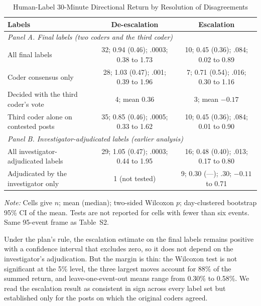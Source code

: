 \documentclass[11pt]{article}
\begin{document}
\begin{table}[h]
\centering
\small
\caption{Human-Label 30-Minute Directional Return by Resolution of Disagreements}
\label{tab:adjudication}
\begin{tabular}{lcc}
\toprule
Labels & De-escalation & Escalation \\
\midrule
\multicolumn{3}{l}{\textit{Panel A. Final labels (two coders and the third coder)}} \\
All final labels & 32; 0.94 (0.46); .0003; 0.38 to 1.73 & 10; 0.45 (0.36); .084; 0.02 to 0.89 \\
Coder consensus only & 28; 1.03 (0.47); .001; 0.39 to 1.96 & 7; 0.71 (0.54); .016; 0.30 to 1.16 \\
Decided with the third coder's vote & 4; mean 0.36 & 3; mean $-0.17$ \\
Third coder alone on contested posts & 35; 0.85 (0.46); .0005; 0.33 to 1.62 & 10; 0.45 (0.36); .084; 0.01 to 0.90 \\
\midrule
\multicolumn{3}{l}{\textit{Panel B. Investigator-adjudicated labels (earlier analysis)}} \\
All investigator-adjudicated labels & 29; 1.05 (0.47); .0003; 0.44 to 1.95 & 16; 0.48 (0.40); .013; 0.17 to 0.80 \\
Adjudicated by the investigator only & 1 (not tested) & 9; 0.30 (---); .30; $-0.11$ to 0.71 \\
\bottomrule
\end{tabular}

\vspace{0.5em}
\begin{minipage}{0.95\textwidth}
\footnotesize\textit{Note:} Cells give $n$; mean (median); two-sided Wilcoxon $p$; day-clustered bootstrap 95\% CI of the mean. Tests are not reported for cells with fewer than six events. Same 95-event frame as Table~S2.
\end{minipage}
\end{table}

\noindent Under the plan's rule, the escalation estimate on the final labels remains positive with a confidence interval that excludes zero, so it does not depend on the investigator's adjudication. But the margin is thin: the Wilcoxon test is not significant at the 5\% level, the three largest moves account for 88\% of the summed return, and leave-one-event-out means range from 0.30\% to 0.58\%. We read the escalation result as consistent in sign across every label set but established only for the posts on which the original coders agreed.
\end{document}
